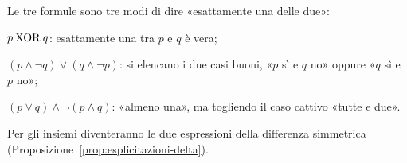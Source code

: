 \begin{spiegazione}
    Le tre formule sono tre modi di dire «esattamente una delle due»:
    \begin{passi}
        \item $p \mathbin{\mathrm{XOR}} q$: esattamente una tra $p$ e $q$ è vera;
        \item $(p \wedge \neg q) \vee (q \wedge \neg p)$: si elencano i due casi buoni, «$p$ sì e $q$ no» oppure «$q$ sì e $p$ no»;
        \item $(p \vee q) \wedge \neg(p \wedge q)$: «almeno una», ma togliendo il caso cattivo «tutte e due».
    \end{passi}
    Per gli insiemi diventeranno le due espressioni della differenza simmetrica (Proposizione~\ref{prop:esplicitazioni-delta}).
\end{spiegazione}


